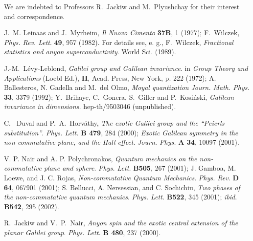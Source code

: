 \documentclass[a4paper,11pt]{article}
\def\parag{\hfil\break} %
\def\kikezd{\parag\underbar}
\begin{document}
\kikezd{Acknowledgement:}
We are indebted to Professors R.~Jackiw
and M.~Plyushchay
for their interest and correspondence.




\begin{thebibliography}{99}
J.~M. Leinaas and J.~Myrheim,
{\sl Il Nuovo Cimento} {\bf 37B}, 1 (1977);
F.~Wilczek, {\sl Phys. Rev. Lett}. {\bf  49}, 957 (1982).
For details
see, e. g., F.~Wilczek,
{\it Fractional statistics and anyon superconductivity}.
World Sci. (1989).

J.-M.~L\'evy-Leblond,
{\it Galilei group and Galilean invariance}.
in {\it Group Theory and Applications} (Loebl Ed.),
{\bf II}, Acad. Press, New York, p. 222 (1972);
A. Ballesteros, N. Gadella and M.~del Olmo,
{\it Moyal quantization}
{\sl Journ. Math. Phys.} {\bf 33}, 3379 (1992);
Y.~Brihaye, C.~Gonera, S.~Giller and P.~Kosi\'nski,
{\it Galilean invariance in \coordHE{} dimensions.}
hep-th/9503046 (unpublished).

C.~ Duval and P.~A.~Horv\'athy,
   {\it The exotic Galilei group and the ``Peierls substitution''}.
{\sl Phys. Lett.} {\bf B 479}, 284 (2000); %
{\it Exotic Galilean symmetry in the non-commutative plane,
and the Hall  effect}.
{\sl Journ. Phys.} {\bf A 34}, 10097 (2001).


V. P. Nair and A. P. Polychronakos,
{\it Quantum mechanics on the non-commutative plane and sphere}.
{\sl Phys. Lett.} {\bf B505}, 267 (2001);
J. Gamboa, M. Loewe, and J. C. Rojas,
{\it Non-commutative Quantum Mechanics}. {\sl Phys. Rev.} {\bf D 64},
067901 (2001);
S. Bellucci, A. Nersessian, and C. Sochichiu,
{\it Two phases of the non-commutative quantum mechanics}.
{\sl Phys. Lett.} {\bf B522}, 345 (2001);
{\it ibid}. {\bf B542}, 295 (2002).

R.~Jackiw and V.~P.~Nair,
{\it Anyon spin and the exotic central extension of the
  planar Galilei group}. %
{\sl Phys. Lett.} {\bf B 480}, 237 (2000).


\end{thebibliography}
\end{document}
